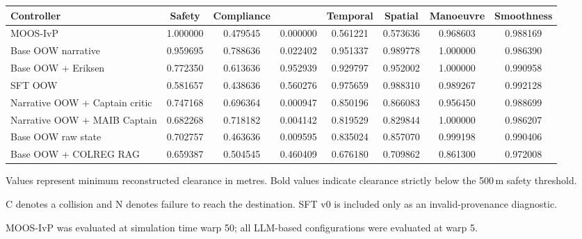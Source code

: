 \documentclass[10pt]{reportMaster}
\begin{document}
\begin{table}[t]
\centering
\label{tab:imazu-axis-results}
\begin{threeparttable}

\scriptsize
\setlength{\tabcolsep}{2.5pt}
\renewcommand{\arraystretch}{1.2}
\begin{tabular}{
p{3.4cm}
S[table-format=1.6]
S[table-format=1.6]
S[table-format=1.6]
S[table-format=1.6]
S[table-format=1.6]
S[table-format=1.6]
S[table-format=1.6]
}
\toprule
\textbf{Controller}
& {\textbf{Safety}}
& {\textbf{Compliance}}
& {}
& {\textbf{Temporal}}
& {\textbf{Spatial}}
& {\textbf{Manoeuvre}}
& {\textbf{Smoothness}} \\
\midrule

MOOS-IvP
& 1.000000 & 0.479545 & 0.000000
& 0.561221 & 0.573636 & 0.968603 & 0.988169 \\

\midrule

Base OOW narrative
& 0.959695 & 0.788636 & 0.022402
& 0.951337 & 0.989778 & 1.000000 & 0.986390 \\

Base OOW + Eriksen
& 0.772350 & 0.613636 & 0.952939
& 0.929797 & 0.952002 & 1.000000 & 0.990958 \\

SFT OOW
& 0.581657 & 0.438636 & 0.560276
& 0.975659 & 0.988310 & 0.989267 & 0.992128 \\

Narrative OOW + Captain critic
& 0.747168 & 0.696364 & 0.000947
& 0.850196 & 0.866083 & 0.956450 & 0.988699 \\

Narrative OOW + MAIB Captain
& 0.682268 & 0.718182 & 0.004142
& 0.819529 & 0.829844 & 1.000000 & 0.986207 \\

Base OOW raw state
& 0.702757 & 0.463636 & 0.009595
& 0.835024 & 0.857070 & 0.999198 & 0.990406 \\

Base OOW + COLREG RAG
& 0.659387 & 0.504545 & 0.460409
& 0.676180 & 0.709862 & 0.861300 & 0.972008 \\

\bottomrule
\end{tabular}

\begin{tablenotes}[flushleft]
\footnotesize
\item Values represent minimum reconstructed clearance
in metres. Bold values indicate clearance strictly
below the 500\,m safety threshold.
\item C denotes a collision and N denotes failure to
reach the destination. SFT v0 is included only as an
invalid-provenance diagnostic.
\item MOOS-IvP was evaluated at simulation time warp 50;
all LLM-based configurations were evaluated at warp 5.
\end{tablenotes}

\end{threeparttable}
\end{table}
\end{document}
